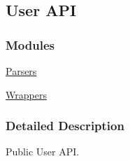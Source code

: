 \hypertarget{group___l_r_c__user_a_p_i}{
\subsection{User API}
\label{group___l_r_c__user_a_p_i}
}
\subsubsection*{Modules}
\begin{DoxyCompactItemize}
\item 
\hyperlink{group___l_r_c__parser}{Parsers}
\item 
\hyperlink{group___l_r_c__wrappers}{Wrappers}
\end{DoxyCompactItemize}


\subsubsection{Detailed Description}
Public User API. 